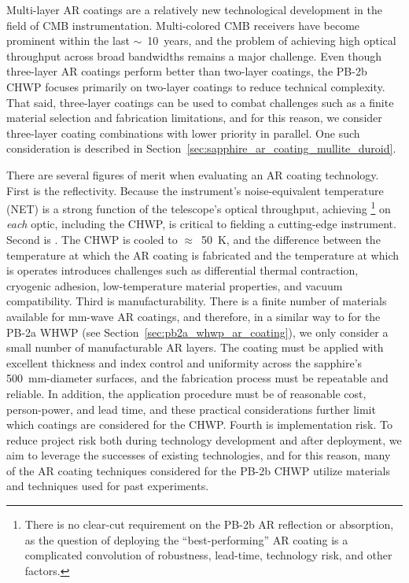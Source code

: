 Multi-layer AR coatings are a relatively new technological development in the field of CMB instrumentation. Multi-colored CMB receivers have become prominent within the last $\sim$~10~years, and the problem of achieving high optical throughput across broad bandwidths remains a major challenge. Even though three-layer AR coatings perform better than two-layer coatings, the PB-2b CHWP focuses primarily on two-layer coatings to reduce technical complexity. That said, three-layer coatings can be used to combat challenges such as a finite material selection and fabrication limitations, and for this reason, we consider three-layer coating combinations with lower priority in parallel. One such consideration is described in Section~\ref{sec:sapphire_ar_coating_mullite_duroid}.

There are several figures of merit when evaluating an AR coating technology. First is the reflectivity. Because the instrument's noise-equivalent temperature (NET) is a strong function of the telescope's optical throughput, achieving \footnote{There is no clear-cut requirement on the PB-2b AR reflection or absorption, as the question of deploying the ``best-performing'' AR coating is a complicated convolution of robustness, lead-time, technology risk, and other factors.} on \textit{each} optic, including the CHWP, is critical to fielding a cutting-edge instrument. Second is . The CHWP is cooled to $\approx$~50~K, and the difference between the temperature at which the AR coating is fabricated and the temperature at which is operates introduces challenges such as differential thermal contraction, cryogenic adhesion, low-temperature material properties, and vacuum compatibility. Third is manufacturability. There is a finite number of materials available for mm-wave AR coatings, and therefore, in a similar way to for the PB-2a WHWP (see Section~\ref{sec:pb2a_whwp_ar_coating}), we only consider a small number of manufacturable AR layers. The coating must be applied with excellent thickness and index control and uniformity across the sapphire's 500~mm-diameter surfaces, and the fabrication process must be repeatable and reliable. In addition, the application procedure must be of reasonable cost, person-power, and lead time, and these practical considerations further limit which coatings are considered for the CHWP. Fourth is implementation risk. To reduce project risk both during technology development and after deployment, we aim to leverage the successes of existing technologies, and for this reason, many of the AR coating techniques considered for the PB-2b CHWP utilize materials and techniques used for past experiments.

